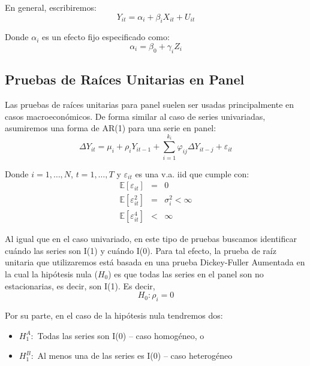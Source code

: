 \documentclass[
]{book}
\begin{document}
En general, escribiremos:
\begin{equation}
    Y_{it} = \alpha_i + \beta_i X_{it} + U_{it}
\end{equation}

Donde \(\alpha_i\) es un efecto fijo especificado como:
\begin{equation}
    \alpha_i = \beta_0 + \gamma_i Z_i
\end{equation}

\hypertarget{pruebas-de-rauxedces-unitarias-en-panel}{%
\subsection{Pruebas de Raíces Unitarias en Panel}\label{pruebas-de-rauxedces-unitarias-en-panel}}

Las pruebas de raíces unitarias para panel suelen ser usadas principalmente en casos macroeconómicos. De forma similar al caso de series univariadas, asumiremos una forma de AR(1) para una serie en panel:
\begin{equation}
    \Delta Y_{it} = \mu_i + \rho_i Y_{i t-1} + \sum_{i = 1}^{k_i} \varphi_{ij} \Delta Y_{i t-j} + \varepsilon_{it}
    \label{eq:eqARPanel}
\end{equation}

Donde \(i = 1, \ldots, N\), \(t = 1, \ldots, T\) y \(\varepsilon_{it}\) es una v.a. iid que cumple con:
\begin{eqnarray*}
    \mathbb{E}[\varepsilon_{it}] & = & 0 \\
    \mathbb{E}[\varepsilon_{it}^2] & = & \sigma^2_i < \infty \\
    \mathbb{E}[\varepsilon_{it}^4] & < & \infty 
\end{eqnarray*}

Al igual que en el caso univariado, en este tipo de pruebas buscamos identificar cuándo las series son I(1) y cuándo I(0). Para tal efecto, la prueba de raíz unitaria que utilizaremos está basada en una prueba Dickey-Fuller Aumentada en la cual la hipótesis nula (\(H_0\)) es que todas las series en el panel son no estacionarias, es decir, son I(1). Es decir,
\begin{equation}
    H_0 : \rho_i = 0
\end{equation}

Por su parte, en el caso de la hipótesis nula tendremos dos:

\begin{itemize}
    \item $H_1^A :$ Todas las series son I(0) -- caso homogéneo, o
    
    \item $H_1^B :$ Al menos una de las series es I(0) -- caso heterogéneo
\end{itemize}
\end{document}
